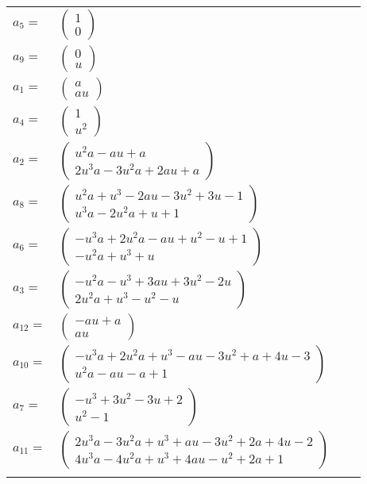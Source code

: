 \documentclass[1p]{elsarticle_modified}
\theoremstyle{definition}
\begin{document}
\begin{tabular}{m{7pt} m{180pt} m{7pt} m{180pt} }
\flushright $a_{5}=$&$\begin{pmatrix}1\\0\end{pmatrix}$ \\
\flushright $a_{9}=$&$\begin{pmatrix}0\\u\end{pmatrix}$ \\
\flushright $a_{1}=$&$\begin{pmatrix}a\\a u\end{pmatrix}$ \\
\flushright $a_{4}=$&$\begin{pmatrix}1\\u^2\end{pmatrix}$ \\
\flushright $a_{2}=$&$\begin{pmatrix}u^2 a- a u+a\\2 u^3 a-3 u^2 a+2 a u+a\end{pmatrix}$ \\
\flushright $a_{8}=$&$\begin{pmatrix}u^2 a+u^3-2 a u-3 u^2+3 u-1\\u^3 a-2 u^2 a+u+1\end{pmatrix}$ \\
\flushright $a_{6}=$&$\begin{pmatrix}- u^3 a+2 u^2 a- a u+u^2- u+1\\- u^2 a+u^3+u\end{pmatrix}$ \\
\flushright $a_{3}=$&$\begin{pmatrix}- u^2 a- u^3+3 a u+3 u^2-2 u\\2 u^2 a+u^3- u^2- u\end{pmatrix}$ \\
\flushright $a_{12}=$&$\begin{pmatrix}- a u+a\\a u\end{pmatrix}$ \\
\flushright $a_{10}=$&$\begin{pmatrix}- u^3 a+2 u^2 a+u^3- a u-3 u^2+a+4 u-3\\u^2 a- a u- a+1\end{pmatrix}$ \\
\flushright $a_{7}=$&$\begin{pmatrix}- u^3+3 u^2-3 u+2\\u^2-1\end{pmatrix}$ \\
\flushright $a_{11}=$&$\begin{pmatrix}2 u^3 a-3 u^2 a+u^3+a u-3 u^2+2 a+4 u-2\\4 u^3 a-4 u^2 a+u^3+4 a u- u^2+2 a+1\end{pmatrix}$\\&\end{tabular}
\end{document}
